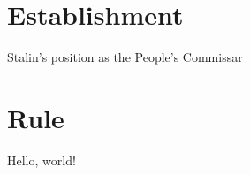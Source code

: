 \documentclass[a4paper,12pt]{article}
\begin{document}

    \section{Establishment}

        Stalin's position as the People's Commissar 


    \section{Rule}

        Hello, world!
        

    \printbibliography
\end{document}
